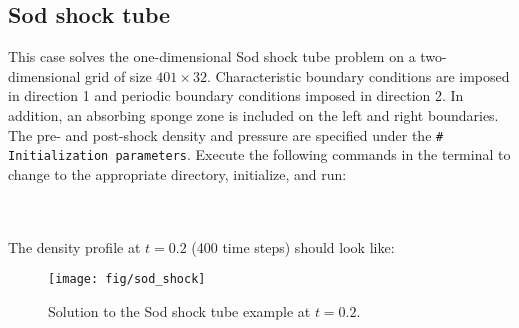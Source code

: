 \documentclass[12pt]{article}
\newcommand{\code}[1]{\texttt{#1}}
\begin{document}
\subsection{Sod shock tube}
This case solves the one-dimensional Sod shock tube problem on a two-dimensional grid of size $401\times 32$. Characteristic boundary conditions are imposed in direction 1 and periodic boundary conditions imposed in direction 2. In addition, an absorbing sponge zone is included on the left and right boundaries. The pre- and post-shock density and pressure are specified under the \code{\# Initialization parameters}. Execute the following commands in the terminal to change to the appropriate directory, initialize, and run:
\\\\
\vspace{1em}
\vspace{.5em}
\\
The density profile at $t=0.2$ (400 time steps) should look like:
 \begin{figure}[h]
	\begin{center}
		\texttt{[image: fig/sod\_shock]}
		\caption{Solution to the Sod shock tube example at $t=0.2$.}
		\label{fig:sod}
	\end{center}
\end{figure}
\end{document}
